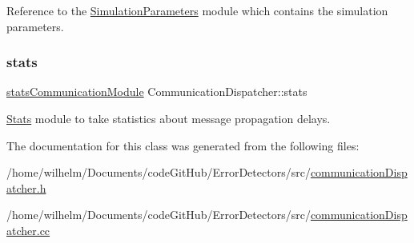 Reference to the \hyperlink{class_simulation_parameters}{Simulation\+Parameters} module which contains the simulation parameters. 

\mbox{\label{class_communication_dispatcher_a5e01e95460682f3a31417efab24b25e4}} 
\subsubsection{\texorpdfstring{stats}{stats}}
{\footnotesize\ttfamily \hyperlink{communication_dispatcher_8h_a9d0242025c5ba7fecd1b0c41f4777c06}{stats\+Communication\+Module} Communication\+Dispatcher\+::stats\hspace{0.3cm}{\ttfamily [private]}}



\hyperlink{class_stats}{Stats} module to take statistics about message propagation delays. 



The documentation for this class was generated from the following files\+:\begin{DoxyCompactItemize}
\item 
/home/wilhelm/\+Documents/code\+Git\+Hub/\+Error\+Detectors/src/\hyperlink{communication_dispatcher_8h}{communication\+Dispatcher.\+h}\item 
/home/wilhelm/\+Documents/code\+Git\+Hub/\+Error\+Detectors/src/\hyperlink{communication_dispatcher_8cc}{communication\+Dispatcher.\+cc}\end{DoxyCompactItemize}
